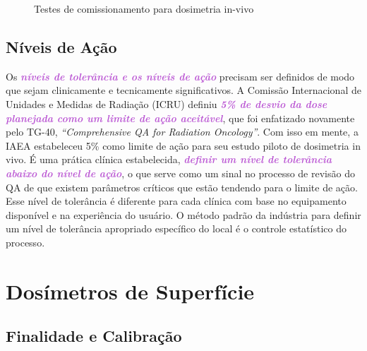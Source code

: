 \documentclass[11pt,a4paper]{article}
\begin{document}
	\begin{figure}[h]
		\centering
		\caption{Testes de comissionamento para dosimetria in-vivo}
		\label{fig:medidasDosimetrosInVivo}
	\end{figure}

\subsection*{Níveis de Ação}

	Os \textcolor{MediumOrchid}{\textbf{\textit{níveis de tolerância e os níveis de ação}}} precisam ser definidos de modo que sejam clinicamente e tecnicamente significativos. A Comissão Internacional de Unidades e Medidas de Radiação (ICRU) definiu \textcolor{MediumOrchid}{\textbf{\textit{5\% de desvio da dose planejada como um limite de ação aceitável}}}, que foi enfatizado novamente pelo TG-40, \textit{``Comprehensive QA for Radiation Oncology''}. Com isso em mente, a IAEA estabeleceu 5\% como limite de ação para seu estudo piloto de dosimetria in vivo. É uma prática clínica estabelecida, \textcolor{MediumOrchid}{\textbf{\textit{definir um nível de tolerância abaixo do nível de ação}}}, o que serve como um sinal no processo de revisão do QA de que existem parâmetros críticos que estão tendendo para o limite de ação. Esse nível de tolerância é diferente para cada clínica com base no equipamento disponível e na experiência do usuário. O método padrão da indústria para definir um nível de tolerância apropriado específico do local é o controle estatístico do processo.

\section{Dosímetros de Superfície}

\subsection*{Finalidade e Calibração}
\end{document}
